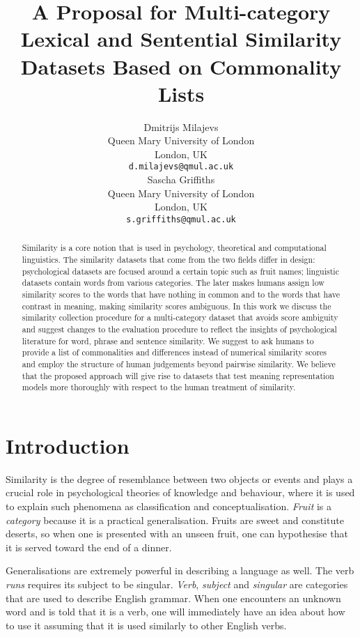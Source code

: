 \documentclass[11pt]{article}
\title{A Proposal for Multi-category Lexical and Sentential Similarity Datasets Based on Commonality Lists}
\author{Dmitrijs Milajevs \\
  Queen Mary University of London \\
  London, UK \\
  {\tt d.milajevs@qmul.ac.uk} \\\And
  Sascha Griffiths \\
  Queen Mary University of London \\
  London, UK \\
  {\tt s.griffiths@qmul.ac.uk} \\
}
\date{}
\begin{document}
\maketitle

\begin{abstract}
Similarity is a core notion that is used in psychology, theoretical and computational linguistics. The similarity datasets that come from the two fields differ in design: psychological datasets are focused around a certain topic such as fruit names; linguistic datasets contain words from various categories. The later makes humans assign low similarity scores to the words that have nothing in common and to the words that have contrast in meaning, making similarity scores ambiguous. In this work we discuss the similarity collection procedure for a multi-category dataset that avoids score ambiguity and suggest changes to the evaluation procedure to reflect the insights of psychological literature for word, phrase and sentence similarity. We suggest to ask humans to provide a list of commonalities and differences instead of numerical similarity scores and employ the structure of human judgements beyond pairwise similarity. We believe that the proposed approach will give rise to datasets that test meaning representation models more thoroughly with respect to the human treatment of similarity.
\end{abstract}

\section{Introduction}
\label{sec:introduction}

Similarity is the degree of resemblance between two objects or events \cite{WCS:WCS1282} and plays a crucial role in psychological theories of knowledge and behaviour, where it is used to explain such phenomena as classification and conceptualisation. \textit{Fruit} is a \emph{category} because it is a practical generalisation. Fruits are sweet and constitute deserts, so when one is presented with an unseen fruit, one can hypothesise that it is served toward the end of a dinner.

Generalisations are extremely powerful in describing a language as well. The verb \textit{runs} requires its subject to be singular. \textit{Verb}, \textit{subject} and \textit{singular} are categories that are used to describe English grammar. When one encounters an unknown word and is told that it is a verb, one will immediately have an idea about how to use it assuming that it is used similarly to other English verbs.
\end{document}
